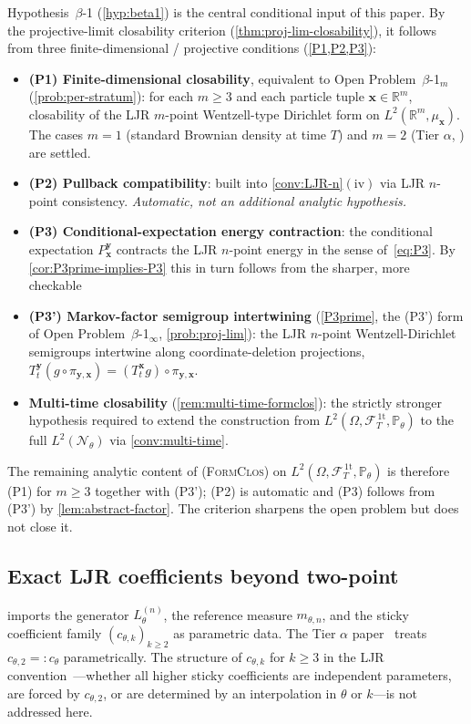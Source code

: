 \documentclass[11pt,reqno]{amsart}
\theoremstyle{plain}
\theoremstyle{definition}
\theoremstyle{remark}
\newcommand{\R}{\mathbb R}
\newcommand{\Prob}{\mathbb P}
\newcommand{\cF}{\mathcal F}
\newcommand{\cN}{\mathcal N}
\newcommand{\FT}{\cF_{T}^{\,\mathrm{1t}}}
\newcommand{\Hone}{L^{2}(\Omega,\FT,\Pth)}
\newcommand{\Lth}[1]{L^{(#1)}_{\theta}}
\newcommand{\Pth}{\Prob_{\theta}}
\begin{document}
Hypothesis~$\beta$-1 (\cref{hyp:beta1}) is the central conditional
input of this paper. By the projective-limit closability criterion
(\cref{thm:proj-lim-closability}), it follows from three
finite-dimensional / projective conditions
(\cref{P1,P2,P3}):
\begin{itemize}
\item \textbf{(P1) Finite-dimensional closability}, equivalent to
Open Problem~$\beta$-1${}_{m}$ (\cref{prob:per-stratum}): for each
$m\ge 3$ and each particle tuple $\mathbf x\in\R^{m}$, closability
of the LJR $m$-point Wentzell-type Dirichlet form on
$L^{2}(\R^{m},\mu_{\mathbf x})$. The cases $m=1$ (standard
Brownian density at time $T$) and $m=2$ (Tier $\alpha$,
\cite{StickyFlowGammaSeed}) are settled.
\item \textbf{(P2) Pullback compatibility}: built into
\cref{conv:LJR-n}$(\mathrm{iv})$ via LJR $n$-point consistency.
\emph{Automatic, not an additional analytic hypothesis.}
\item \textbf{(P3) Conditional-expectation energy contraction}:
the conditional expectation $P_{\mathbf x}^{\mathbf y}$ contracts
the LJR $n$-point energy in the sense of~\eqref{eq:P3}. By
\cref{cor:P3prime-implies-P3} this in turn follows from the
sharper, more checkable
\item \textbf{(P3') Markov-factor semigroup intertwining}
(\cref{P3prime}, the (P3') form of
Open Problem~$\beta$-1${}_{\infty}$, \cref{prob:proj-lim}): the
LJR $n$-point Wentzell-Dirichlet semigroups intertwine along
coordinate-deletion projections,
$T_{t}^{\mathbf y}(g\circ\pi_{\mathbf y,\mathbf x})=(T_{t}^{\mathbf x}g)\circ\pi_{\mathbf y,\mathbf x}$.
\item \textbf{Multi-time closability} (\cref{rem:multi-time-formclos}):
the strictly stronger hypothesis required to extend the
construction from $\Hone$ to the full $L^{2}(\cN_{\theta})$ via
\cref{conv:multi-time}.
\end{itemize}
The remaining analytic content of \textsc{(FormClos)} on $\Hone$
is therefore (P1) for $m\ge 3$ together with (P3'); (P2) is
automatic and (P3) follows from (P3') by
\cref{lem:abstract-factor}. The criterion sharpens the open
problem but does not close it.

\subsection{Exact LJR coefficients beyond two-point}\label{sec:open-coeff}

 imports the generator $\Lth{n}$, the reference
measure $m_{\theta,n}$, and the sticky coefficient family
$(c_{\theta,k})_{k\ge 2}$ as parametric data. The Tier $\alpha$
paper~\cite{StickyFlowGammaSeed} treats $c_{\theta,2}=:c_{\theta}$
parametrically. The structure of $c_{\theta,k}$ for $k\ge 3$ in the
LJR convention~\cite[\S 3]{LeJanRaimond2004}---whether all higher
sticky coefficients are independent parameters, are forced by
$c_{\theta,2}$, or are determined by an interpolation in $\theta$
or $k$---is not addressed here.
\end{document}

